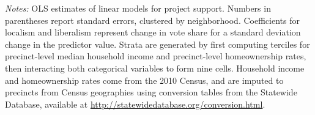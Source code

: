 \documentclass[article,12pt]{memoir}
\begin{document}
\begin{SingleSpacing}
\begin{landscape}
\begin{table}
\begin{threeparttable}
\begin{tabularx}{\linewidth}{X}
  \end{tabularx}
  \begin{tablenotes}[flushleft]
    \item \hspace{-.2em}\emph{Notes:} OLS estimates of linear models for project support. Numbers in parentheses report standard errors, clustered by neighborhood. Coefficients for localism and liberalism represent change in vote share for a standard deviation change in the predictor value. Strata are generated by first computing terciles for precinct-level median household income and precinct-level homeownership rates, then interacting both categorical variables to form nine cells. Household income and homeownership rates come from the 2010 Census, and are imputed to precincts from Census geographies using conversion tables from the Statewide Database, available at \url{http://statewidedatabase.org/conversion.html}.
  \end{tablenotes}
  \end{threeparttable}
\end{table}

\end{landscape}
\restoregeometry

\end{SingleSpacing}
\end{document}
